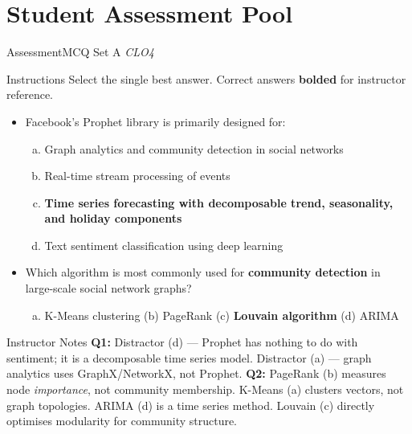 \documentclass[aspectratio=169,10pt]{beamer}
\begin{document}
\section{Student Assessment Pool}

\begin{frame}{Assessment\textemdash MCQ Set A \hfill\small\textit{CLO4}}
  \begin{exampleblock}{Instructions}
    Select the single best answer.  Correct answers \textbf{bolded} for instructor reference.
  \end{exampleblock}
  \vspace{6pt}
  \begin{itemize}
    \item[\textbf{Q1.}] Facebook's Prophet library is primarily designed for:
    \begin{enumerate}[(a)]
      \item Graph analytics and community detection in social networks
      \item Real-time stream processing of events
      \item \textbf{Time series forecasting with decomposable trend, seasonality, and holiday components}
      \item Text sentiment classification using deep learning
    \end{enumerate}
  \end{itemize}
  \vspace{8pt}
  \begin{itemize}
    \item[\textbf{Q2.}] Which algorithm is most commonly used for \textbf{community detection} in large-scale social network graphs?
    \begin{enumerate}[(a)]
      \item K-Means clustering \quad (b) PageRank \quad (c) \textbf{Louvain algorithm} \quad (d) ARIMA
    \end{enumerate}
  \end{itemize}
  \vspace{6pt}
  \begin{alertblock}{Instructor Notes}
    \textbf{Q1:} Distractor (d) --- Prophet has nothing to do with sentiment; it is a decomposable time series model. Distractor (a) --- graph analytics uses GraphX/NetworkX, not Prophet.  \textbf{Q2:} PageRank (b) measures node \textit{importance}, not community membership.  K-Means (a) clusters vectors, not graph topologies.  ARIMA (d) is a time series method.  Louvain (c) directly optimises modularity for community structure.
  \end{alertblock}
\end{frame}
\end{document}
